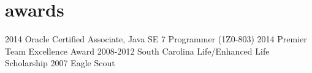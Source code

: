 
\section{awards}

\begin{entrylist}


\entry
{2014}
{Oracle Certified Associate, Java SE 7 Programmer (1Z0-803)}
{}
{}
\entry
{2014}
{Premier Team Excellence Award}
{}
{}
\entry
{2008-2012}
{South Carolina Life/Enhanced Life Scholarship}
{}
{}
\entry
{2007}
{Eagle Scout}
{}
{}


\end{entrylist}
